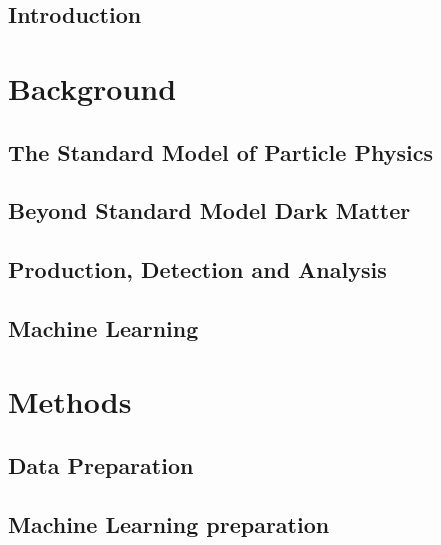 \documentclass[12pt, a4paper]{book}
\begin{document}
\newpage
\tableofcontents
\listoffigures
\listoftables

\newpage
{}



\chapter{Introduction}\label{chap:intro}




\part{Background}
\chapter{The Standard Model of Particle Physics}\label{chap:SM}


\chapter{Beyond Standard Model Dark Matter}\label{chap:DM}


\chapter{Production, Detection and Analysis}\label{chap:CERN_method}


\chapter{Machine Learning}\label{chap:theo_ML}




\part{Methods}
\chapter{Data Preparation}\label{chap:data_prep}


\chapter{Machine Learning preparation}\label{chap:ML}

\end{document}

